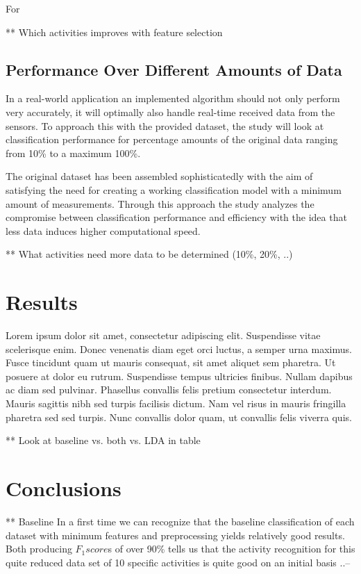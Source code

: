 \documentclass{sig-alternate}
\begin{document}
For 




** Which activities improves with feature selection

\subsection{Performance Over Different Amounts of Data}
In a real-world application an implemented algorithm should not only perform very accurately, it will optimally also handle real-time received data from the sensors. To approach this with the provided dataset, the study will look at classification performance for percentage amounts of the original data ranging from 10\% to a maximum 100\%.

The original dataset has been assembled sophisticatedly with the aim of satisfying the need for creating a working classification model with a minimum amount of measurements. Through this approach the study analyzes the compromise between classification performance and efficiency with the idea that less data induces higher computational speed.

** What activities need more data to be determined (10\%, 20\%, ..)


\section{Results}
Lorem ipsum dolor sit amet, consectetur adipiscing elit. Suspendisse vitae scelerisque enim. Donec venenatis diam eget orci luctus, a semper urna maximus. Fusce tincidunt quam ut mauris consequat, sit amet aliquet sem pharetra. Ut posuere at dolor eu rutrum. Suspendisse tempus ultricies finibus. Nullam dapibus ac diam sed pulvinar. Phasellus convallis felis pretium consectetur interdum. Mauris sagittis nibh sed turpis facilisis dictum. Nam vel risus in mauris fringilla pharetra sed sed turpis. Nunc convallis dolor quam, ut convallis felis viverra quis.

** Look at baseline vs. both vs. LDA in table


\section{Conclusions}
** Baseline
In a first time we can recognize that the baseline classification of each dataset with minimum features and preprocessing yields relatively good results. Both producing $F_1 score$s of over 90\% tells us that the activity recognition for this quite reduced data set of 10 specific activities is quite good on an initial basis ..--
\end{document}
